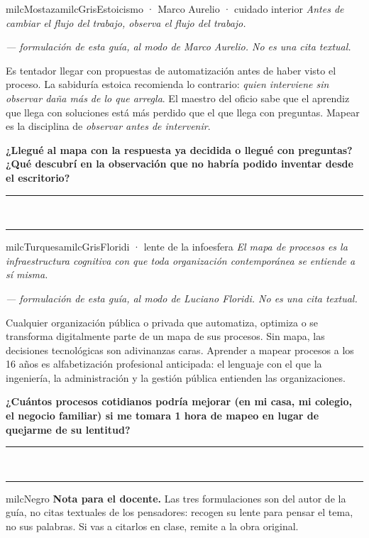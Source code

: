 \documentclass[11pt,letterpaper]{article}
\newcommand{\linead}[1]{\noindent\color{milcLinea}\rule{#1}{0.5pt}\color{milcNegro}}
\begin{document}
\begin{softbox}{milcMostaza}{milcGris}{Estoicismo · Marco Aurelio · cuidado interior}
\textit{Antes de cambiar el flujo del trabajo, observa el flujo del trabajo.}

{\footnotesize\itshape\color{milcNegro!70}--- formulación de esta guía, al modo de Marco Aurelio. No es una cita textual.}

Es tentador llegar con propuestas de automatización antes de haber visto el proceso. La sabiduría estoica recomienda lo contrario: \emph{quien interviene sin observar daña más de lo que arregla}. El maestro del oficio sabe que el aprendiz que llega con soluciones está más perdido que el que llega con preguntas. Mapear es la disciplina de \emph{observar antes de intervenir}.

\textbf{¿Llegué al mapa con la respuesta ya decidida o llegué con preguntas? ¿Qué descubrí en la observación que no habría podido inventar desde el escritorio?}
\end{softbox}
\linead{\linewidth}\\[1mm]
\linead{\linewidth}

\begin{softbox}{milcTurquesa}{milcGris}{Floridi · lente de la infoesfera}
\textit{El mapa de procesos es la infraestructura cognitiva con que toda organización contemporánea se entiende a sí misma.}

{\footnotesize\itshape\color{milcNegro!70}--- formulación de esta guía, al modo de Luciano Floridi. No es una cita textual.}

Cualquier organización pública o privada que automatiza, optimiza o se transforma digitalmente parte de un mapa de sus procesos. Sin mapa, las decisiones tecnológicas son adivinanzas caras. Aprender a mapear procesos a los 16 años es alfabetización profesional anticipada: el lenguaje con el que la ingeniería, la administración y la gestión pública entienden las organizaciones.

\textbf{¿Cuántos procesos cotidianos podría mejorar (en mi casa, mi colegio, el negocio familiar) si me tomara 1 hora de mapeo en lugar de quejarme de su lentitud?}
\end{softbox}
\linead{\linewidth}\\[1mm]
\linead{\linewidth}

\begin{infoband}{milcNegro}
\textbf{Nota para el docente.} Las tres formulaciones son del autor de la guía, no citas textuales de los pensadores: recogen su lente para pensar el tema, no sus palabras. Si vas a citarlos en clase, remite a la obra original.
\end{infoband}
\end{document}
